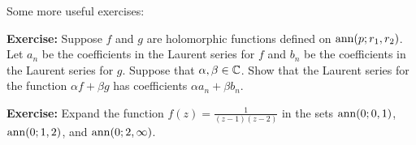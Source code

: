 \documentclass[10pt,aspectratio=169]{beamer}
\begin{document}
\begin{frame}
Some more useful exercises:

\medskip
\pause

\textbf{Exercise:}
Suppose $f$ and $g$ are holomorphic functions defined on
$\operatorname{ann}(p;r_1,r_2)$.  Let $a_n$ be the coefficients in the Laurent series for
$f$ and $b_n$ be the coefficients in the Laurent series for $g$.  Suppose
that $\alpha,\beta \in {\mathbb{C}}$.  Show that the Laurent series for the function
$\alpha f + \beta g$ has coefficients $\alpha a_n + \beta b_n$.

\medskip
\pause

\textbf{Exercise:}
Expand the function $f(z) = \frac{1}{(z-1)(z-2)}$ in the
sets
$\operatorname{ann}(0;0,1)$, $\operatorname{ann}(0;1,2)$, and $\operatorname{ann}(0;2,\infty)$.


\end{frame}
\end{document}
